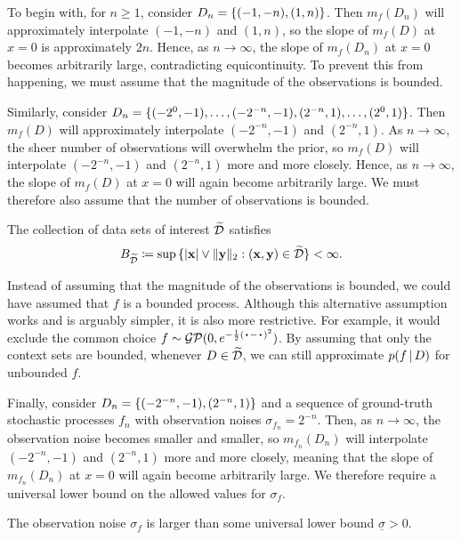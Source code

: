\documentclass[12pt, twoside]{report}
\begin{document}
To begin with, for $n \ge 1$, consider $D_n = \{(-1, -n), (1, n)\}$.
Then $m_f(D_n)$ will approximately interpolate $(-1, -n)$ and $(1, n)$, so the slope of $m_f(D)$ at $x = 0$ is approximately $2n$.
Hence, as $n \to \infty$, the slope of $m_f(D_n)$ at $x = 0$ becomes arbitrarily large, contradicting equicontinuity.
To prevent this from happening, we must assume that the magnitude of the observations is bounded.
 
Similarly, consider $D_n = \{(-2^{0}, -1),\ldots, (-2^{-n}, -1), (2^{-n}, 1), \ldots, (2^0, 1)\}$.
Then $m_f(D)$ will approximately interpolate $(-2^{-n}, -1)$ and $(2^{-n}, 1)$.
As $n \to \infty$, the sheer number of observations will overwhelm the prior,
so $m_f(D)$ will interpolate $(-2^{-n}, -1)$ and $(2^{-n}, 1)$ more and more closely.
Hence, as $n \to \infty$, the slope of $m_f(D)$ at $x = 0$ will again become arbitrarily large.
We must therefore also assume that the number of observations is bounded.

\begin{assumption}
    \label{assum:context_boundedness}
    The collection of data sets of interest $\widetilde{\mathcal{D}}$ satisfies
    \begin{equation}
        B_{\widetilde{\mathcal{D}}} \coloneqq \operatorname*{sup}\,\{\lvert\mathbf{x}\rvert \lor \lVert\mathbf{y}\rVert_2 : (\mathbf{x}, \mathbf{y}) \in \widetilde{\mathcal{D}}\} < \infty.
    \end{equation}
\end{assumption}

Instead of assuming that the magnitude of the observations is bounded, we could have assumed that $f$ is a bounded process.
Although this alternative assumption works and is arguably simpler, it is also more restrictive.
For example, it would exclude the common choice $f \sim \GP(0, e^{-\frac12(\vardot - \vardot)^2})$.
By assuming that only the context sets are bounded, whenever $D \in \widetilde{\mathcal{D}}$, we can still approximate $p(f \,|\, D)$ for unbounded $f$.

Finally, consider $D_n = \{(-2^{-n}, -1), (2^{-n}, 1)\}$ and a sequence of ground-truth stochastic processes $f_n$ with observation noises $\sigma_{f_n} = 2^{-n}$.
Then, as $n \to \infty$, the observation noise becomes smaller and smaller, so $m_{f_n}(D_n)$ will interpolate $(-2^{-n}, -1)$ and $(2^{-n}, 1)$ more and more closely, meaning that the slope of $m_{f_n}(D_n)$ at $x = 0$ will again become arbitrarily large.
We therefore require a universal lower bound on the allowed values for $\sigma_f$.

\begin{assumption} \label{assum:noise_boundedness}
    The observation noise $\sigma_f$ is larger than some universal lower bound $\underline{\sigma} > 0$.
\end{assumption}
\end{document}

